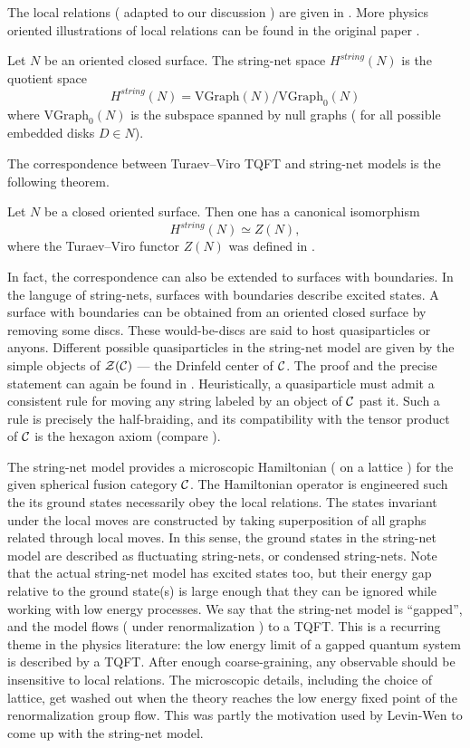 The local relations ( adapted to our discussion ) are given in . More physics
oriented illustrations of local relations can be found in the original paper .

\begin{definition}
	Let $N$ be an oriented closed surface. The string-net space $H^{string}(N)$ is the quotient space
	\[
		H^{string}(N) = \mathrm{VGraph}(N)/\mathrm{VGraph}_0(N)
	\]
	where $\mathrm{VGraph}_0(N)$ is the subspace spanned by null graphs ( for all possible embedded 
	disks $D \in N$).
\end{definition}

The correspondence between Turaev--Viro TQFT and string-net models is the 
following theorem.

\begin{theorem}\label{t:tv-equals-stringnet}
	Let $N$ be a closed oriented surface. Then one has a canonical isomorphism
	\[
		H^{string}(N) \simeq Z(N),
	\]
	where the Turaev--Viro functor $Z(N)$ was defined in .
\end{theorem}

In fact, the correspondence can also be extended to surfaces with boundaries. 
In the languge of string-nets, surfaces with boundaries describe excited states. 
A surface with boundaries can be obtained from an oriented closed surface
by removing some discs. These would-be-discs are said to host quasiparticles 
or anyons. Different possible quasiparticles in the string-net model are given 
by the simple objects of $\mathcal{Z}(\mathcal{C})$ --- the Drinfeld center of $\mathcal{C}$. 
The proof and the precise statement can again be found in .
Heuristically, a quasiparticle must admit a consistent rule for moving any string labeled
by an object of $\mathcal{C}$ past it. Such a rule is precisely the half-braiding, and its
compatibility with the tensor product of $\mathcal{C}$ is the hexagon axiom 
(compare ).

The string-net model provides a microscopic Hamiltonian ( on a lattice ) for the given
spherical fusion category $\mathcal{C}$. The 
Hamiltonian operator is engineered such the its
ground states necessarily obey the local relations. The states invariant under
the local moves are constructed by taking superposition of all graphs
related through local moves. In this sense, the ground states in the string-net model are
described as fluctuating string-nets, or condensed string-nets. Note that the actual 
string-net model has excited states too, but their energy gap relative to the
ground state(s) is large enough that they can be ignored while working with low
energy processes. We say that the string-net model is ``gapped'', and the model
flows ( under renormalization ) to a TQFT.
This is a recurring theme in the physics literature: the low energy
limit of a gapped quantum system is described by a TQFT. After enough coarse-graining,
any observable should be insensitive to local relations. The microscopic details,
including the choice of lattice, get washed out when the theory reaches the low energy 
fixed point of the renormalization group flow. This was partly the motivation used by Levin-Wen 
to come up with the string-net model.



